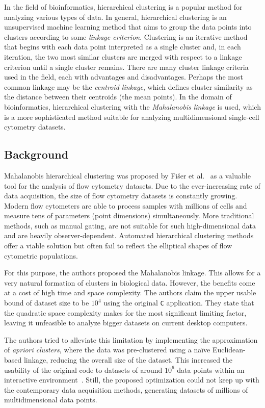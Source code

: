 In the field of bioinformatics, hierarchical clustering is a popular method for analyzing various types of data.
In general, hierarchical clustering is an unsupervised machine learning method that aims to group the data points into clusters according to some \emph{linkage criterion}.
Clustering is an iterative method that begins with each data point interpreted as a single cluster and, in each iteration, the two most similar clusters are merged with respect to a linkage criterion until a single cluster remains.
There are many cluster linkage criteria used in the field, each with advantages and disadvantages.
Perhaps the most common linkage may be the \emph{centroid linkage}, which defines cluster similarity as the distance between their centroids (the mean points). In the domain of bioinformatics, hierarchical clustering with the \emph{Mahalanobis linkage} is used, which is a more sophisticated method suitable for analyzing multidimensional single-cell cytometry datasets.

\subsection{Background}

Mahalanobis hierarchical clustering was proposed by Fišer et al.~\cite{fivser2012detection} as a valuable tool for the analysis of flow cytometry datasets. Due to the ever-increasing rate of data acquisition, the size of flow cytometry datasets is constantly growing. Modern flow cytometers are able to process samples with millions of cells and measure tens of parameters (point dimensions) simultaneously. More traditional methods, such as manual gating, are not suitable for such high-dimensional data and are heavily observer-dependent. Automated hierarchical clustering methods offer a viable solution but often fail to reflect the elliptical shapes of flow cytometric populations.

For this purpose, the authors proposed the Mahalanobis linkage. This allows for a very natural formation of clusters in biological data. However, the benefits come at a cost of high time and space complexity. The authors claim the upper usable bound of dataset size to be $10^4$ using the original \texttt{C} application. They state that the quadratic space complexity makes for the most significant limiting factor, leaving it unfeasible to analyze bigger datasets on current desktop computers.

The authors tried to alleviate this limitation by implementing the approximation of \emph{apriori clusters}, where the data was pre-clustered using a na\"{i}ve Euclidean-based linkage, reducing the overall size of the dataset. This increased the usability of the original code to datasets of around $10^6$ data points within an interactive environment~\cite{kratochvil2020shinysom}. Still, the proposed optimization could not keep up with the contemporary data acquisition methods, generating datasets of millions of multidimensional data points.

